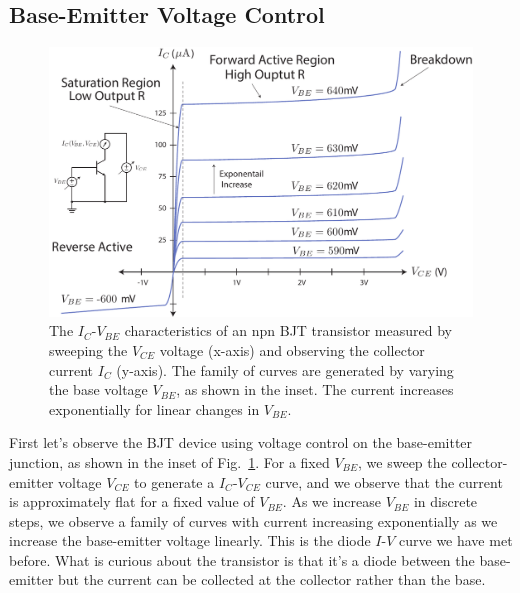 \subsection{Base-Emitter Voltage Control}
\begin{figure}[tb]
\centering
\includegraphics[width=\columnwidth]{slide8_bjt_ic_vs_ve_curves}
\caption{The $I_C$-$V_{BE}$ characteristics of an npn BJT transistor measured by sweeping the $V_{CE}$ voltage (x-axis) and observing the collector current $I_C$ (y-axis).  The family of curves are generated by varying the base voltage $V_{BE}$, as shown in the inset.  The current increases exponentially for linear changes in $V_{BE}$.}
\label{fig:slide8_bjt_ic_vs_ve_curves}
\end{figure}
First let's observe the BJT device using voltage control on the base-emitter junction, as shown in the inset of Fig.~\ref{fig:slide8_bjt_ic_vs_ve_curves}.  For a fixed $V_{BE}$, we sweep the collector-emitter voltage $V_{CE}$ to generate a $I_C$-$V_{CE}$ curve, and we observe that the current is approximately flat for a fixed value of $V_{BE}$.  As we increase $V_{BE}$ in discrete steps, we observe a family of curves with current increasing exponentially as we increase the base-emitter voltage linearly.  This is the diode $I$-$V$ curve we have met before.  What is curious about the transistor is that it's a diode between the base-emitter but the current can be collected at the collector rather than the base.
